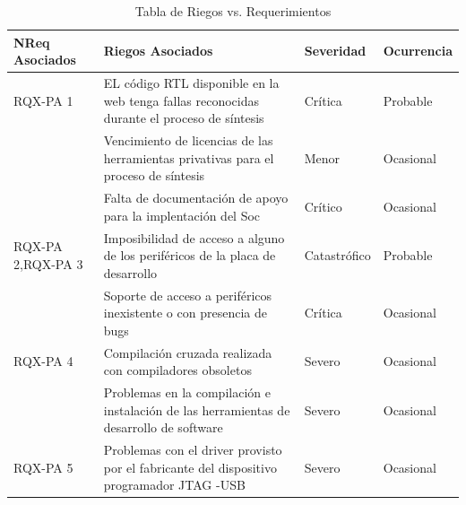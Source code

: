 \begin{table}[h!]
		\centering
		\begin{tabular}{ p{2.5cm} p{9cm} p{2cm} p{2cm} }
		\hline 
		\rowcolor[gray]{0.8} N\textordmasculine Req Asociados& Riegos Asociados & Severidad  & Ocurrencia \\
		\hline
		RQX-PA 1& EL código RTL disponible en la web tenga fallas reconocidas durante el proceso de síntesis & Crítica       & Probable \\
		\hline
				& Vencimiento de licencias de las herramientas privativas para el proceso de síntesis  & Menor  & Ocasional\\	 
		\hline
				& Falta de documentación de apoyo para la implentación
del Soc & Crítico & Ocasional\\	 
		\hline

		RQX-PA 2,RQX-PA 3 & Imposibilidad de acceso a alguno de los periféricos de la placa de desarrollo &  Catastrófico  & Probable\\
		\hline
		& Soporte de acceso a periféricos inexistente o con presencia
de bugs & Crítica  & Ocasional\\	 
		\hline
		RQX-PA 4& Compilación cruzada realizada con compiladores obsoletos & Severo  &  Ocasional\\ 
		\hline
		&Problemas en la compilación e instalación de las herramientas de desarrollo de software  & Severo  &  Ocasional\\ 
		\hline
		RQX-PA 5& Problemas con el driver provisto por el fabricante del  dispositivo programador JTAG -USB & Severo&  Ocasional\\
		\hline
		\end{tabular}
		\caption{Tabla de Riegos vs. Requerimientos}
		\end{table}



